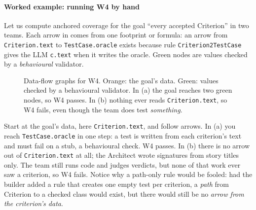 \documentclass[10pt,a4paper]{article}
\newcommand{\W}[1]{\textsf{W#1}}
\newcommand{\devteam}{\textsc{DevTeam}}
\newcommand{\cls}[1]{\textsf{#1}}
\newcommand{\code}[1]{\texttt{#1}}
\begin{document}
\paragraph{Worked example: running \W{4} by hand} Let us compute
anchored coverage for the goal ``every accepted \cls{Criterion}'' in two
teams. Each arrow in  comes from one footprint or formula: an
arrow from \code{Criterion.text} to \code{TestCase.oracle} exists because
rule \code{Criterion2TestCase} gives the LLM \code{c.text} when it writes the
oracle. Green nodes are values checked by a \emph{behavioural} validator.

\begin{figure}[!htb]
\centering
{}
\caption{Data-flow graphs for \W{4}. Orange: the goal's data. Green: values
checked by a behavioural validator. In (a) the goal reaches two green
nodes, so \W{4} passes. In (b) nothing ever reads \code{Criterion.text}, so
\W{4} fails, even though the team does test \emph{something}.}
\label{fig:w4}
\end{figure}

Start at the goal's data, here \code{Criterion.text}, and follow arrows. In
(a) you reach \code{TestCase.oracle} in one step: a test is written from
each criterion's text and must fail on a stub, a behavioural check.
\W{4} passes. In (b) there is no arrow out of \code{Criterion.text} at all;
the Architect wrote signatures from story titles only. The team still runs
code and judges verdicts, but none of that work ever saw a criterion, so
\W{4} fails. Notice why a path-only rule would be fooled: had the builder
added a rule that creates one empty test per criterion, a \emph{path} from
\cls{Criterion} to a checked class would exist, but there would still be no
\emph{arrow from the criterion's data}.
\end{document}
